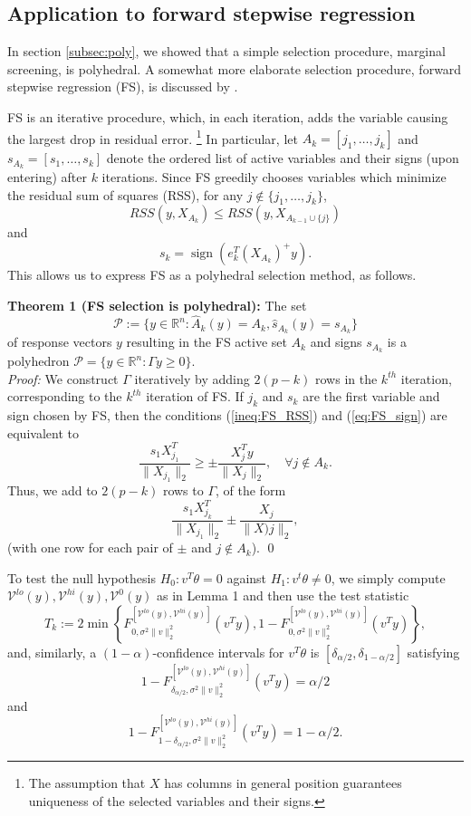 \documentclass{article}
\newcommand{\R}{\mathbb{R}}
\newcommand{\sgn}{\operatorname{sign}}
\newcommand{\poly}{\mathcal{P}}
\newcommand{\V}{\mathcal{V}}
\renewcommand{\hat}{\widehat}
\begin{document}
\subsection{Application to forward stepwise regression}
In section \ref{subsec:poly}, we showed that a simple selection procedure,
marginal screening, is polyhedral. A somewhat more elaborate selection
procedure, forward stepwise regression (FS), is discussed by
\citet{taylor14post}.

FS is an iterative procedure, which, in each iteration, adds the variable
causing the largest drop in residual error.
\footnote{The assumption that $X$ has columns in general position guarantees
uniqueness of the selected variables and their signs.}
In particular, let $A_k = [j_1,\dots,j_k]$ and $s_{A_k} = [s_1,\dots,s_k]$
denote the ordered list of active variables and their signs (upon entering)
after $k$ iterations. Since FS greedily chooses variables which minimize the
residual sum of squares (RSS), for any $j \notin \{j_1,\dots,j_k\}$,
\begin{equation}
RSS(y,X_{A_k}) \leq RSS(y,X_{A_{k - 1} \cup \{j\}})
\label{ineq:FS_RSS}
\end{equation}
and
\begin{equation}
s_k = \sgn(e_k^T (X_{A_k})^+ y).
\label{eq:FS_sign}
\end{equation}
This allows us to express FS as a polyhedral selection method, as follows.

{\bf Theorem 1 (FS selection is polyhedral):} The set
\[\poly := \{y \in \R^n : \hat A_k(y) = A_k, \hat s_{A_k}(y) = s_{A_k}\}\]
of response vectors $y$ resulting in the FS active set $A_k$ and signs
$s_{A_k}$ is a polyhedron $\poly = \{y \in \R^n : \Gamma y \geq 0\}$. \\

\emph{Proof:}
We construct $\Gamma$ iteratively by adding $2(p - k)$ rows in the $k^{th}$
iteration, corresponding to the $k^{th}$ iteration of FS. If $j_k$ and $s_k$
are the first variable and sign chosen by FS, then the conditions
(\ref{ineq:FS_RSS}) and (\ref{eq:FS_sign}) are equivalent to
\[\frac{s_1X_{j_1}^T}{\|X_{j_1}\|_2} \geq \pm \frac{X_j^Ty}{\|X_j\|_2},
    \quad \forall j \notin A_k.\]
Thus, we add to $2(p - k)$ rows to $\Gamma$, of the form
\[\frac{s_1X_{j_k}^T}{\|X_{j_1}\|_2} \pm \frac{X_j}{\|X)j\|_2},\]
(with one row for each pair of $\pm$ and $j \notin A_k$). \qed

To test the null hypothesis $H_0 : v^T \theta = 0$ against
$H_1 : v^t \theta \neq 0$, we simply compute $\V^{lo}(y),\V^{hi}(y),\V^0(y)$ as
in Lemma 1 and then use the test statistic
\[T_k := 2\min\left\{ F^{[\V^{lo}(y),\V^{hi}(y)]}_{0,\sigma^2\|v\|_2^2}(v^T y),
        1 - F^{[\V^{lo}(y),\V^{hi}(y)]}_{0,\sigma^2\|v\|_2^2}(v^T y)\right\},\]
and, similarly, a $(1 - \alpha)$-confidence intervals for $v^T \theta$ is
$[\delta_{\alpha/2}, \delta_{1 - \alpha/2}]$ satisfying
\[1 - F^{[\V^{lo}(y),\V^{hi}(y)]}_{\delta_{\alpha/2},\sigma^2\|v\|_2^2}(v^T y)
    = \alpha/2\]
and
\[1 - F^{[\V^{lo}(y),\V^{hi}(y)]}
                    _{1 - \delta_{\alpha/2},\sigma^2\|v\|_2^2}(v^T y)
    = 1 - \alpha/2.\]
\end{document}
